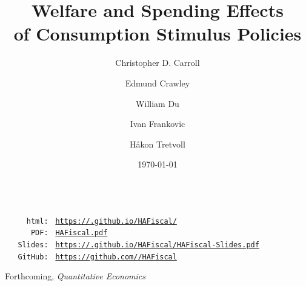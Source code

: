 \documentclass[titlepage, headings=optiontotocandhead]{econark}
\begin{document}
\renewcommand{\onlyinsubfile}[1]{}
\renewcommand{\notinsubfile}[1]{#1}

\title{Welfare and Spending Effects \\ of Consumption Stimulus Policies}

\author{Christopher D. Carroll\authNum \and Edmund Crawley\authNum \and William Du\authNum \and Ivan Frankovic\authNum \and H{\aa}kon Tretvoll\authNum}

\date{\today}
\maketitle

\hypertarget{links}{}

\newcommand{\REMARK}{\href{https://github.com/econ-ark/REMARK}{REMARK}}
\begin{footnotesize}
	\parbox{0.9\textwidth}{
			\begin{tabbing}
				\texttt{~~~~~~~~~~~} \= \=  \\ 
				\texttt{~~~~~html:~} \> \> \texttt{\href{https://\owner.github.io/HAFiscal/}{https://\owner.github.io/HAFiscal/}} \\ %
				\texttt{~~~~~~PDF:~} \> \> \texttt{\href{https://github.com/\owner/HAFiscal/blob/master/HAFiscal.pdf}{HAFiscal.pdf}} \\ 
				\texttt{~~~Slides:~} \> \> \texttt{\href{https://\owner.github.io/HAFiscal/HAFiscal-Slides.pdf}{https://\owner.github.io/HAFiscal/HAFiscal-Slides.pdf}} \\ %
				\texttt{~~~GitHub:~} \> \> \texttt{\href{https://github.com/\owner/HAFiscal}{https://github.com/\owner/HAFiscal}} \\
			\end{tabbing}
	} %
\end{footnotesize}

\centerline{Forthcoming, \textit{Quantitative Economics}}
\end{document}
